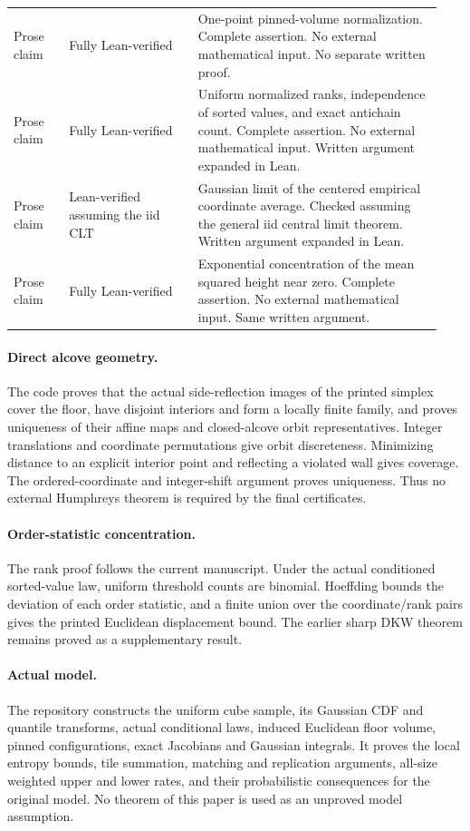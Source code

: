 \begin{longtable}{@{}p{0.12\linewidth}p{0.29\linewidth}p{0.53\linewidth}@{}}
Prose claim & Fully Lean-verified & One-point pinned-volume normalization. Complete assertion. No external mathematical input. No separate written proof. \\

Prose claim & Fully Lean-verified & Uniform normalized ranks, independence of sorted values, and exact antichain count. Complete assertion. No external mathematical input. Written argument expanded in Lean. \\

Prose claim & Lean-verified assuming the iid CLT & Gaussian limit of the centered empirical coordinate average. Checked assuming the general iid central limit theorem. Written argument expanded in Lean. \\

Prose claim & Fully Lean-verified & Exponential concentration of the mean squared height near zero. Complete assertion. No external mathematical input. Same written argument. \\

\end{longtable}\normalsize

\paragraph{Direct alcove geometry.} The code proves that the actual side-reflection images of the printed simplex cover the floor, have disjoint interiors and form a locally finite family, and proves uniqueness of their affine maps and closed-alcove orbit representatives. Integer translations and coordinate permutations give orbit discreteness. Minimizing distance to an explicit interior point and reflecting a violated wall gives coverage. The ordered-coordinate and integer-shift argument proves uniqueness. Thus no external Humphreys theorem is required by the final certificates.

\paragraph{Order-statistic concentration.} The rank proof follows the current manuscript. Under the actual conditioned sorted-value law, uniform threshold counts are binomial. Hoeffding bounds the deviation of each order statistic, and a finite union over the coordinate/rank pairs gives the printed Euclidean displacement bound. The earlier sharp DKW theorem remains proved as a supplementary result.

\paragraph{Actual model.} The repository constructs the uniform cube sample, its Gaussian CDF and quantile transforms, actual conditional laws, induced Euclidean floor volume, pinned configurations, exact Jacobians and Gaussian integrals. It proves the local entropy bounds, tile summation, matching and replication arguments, all-size weighted upper and lower rates, and their probabilistic consequences for the original model. No theorem of this paper is used as an unproved model assumption.

